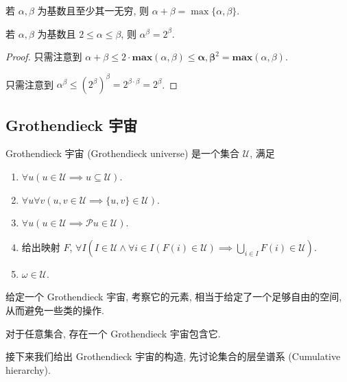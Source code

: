 \begin{corollary}
    若 \(\alpha, \beta\) 为基数且至少其一无穷, 则 \(\alpha + \beta = \max \{\alpha, \beta\}\).

    若 \(\alpha, \beta\) 为基数且 \(2 \le \alpha \le \beta\), 则 \(\alpha^\beta = 2^\beta\).

    \begin{proof}
        只需注意到 \(\alpha + \beta \le 2 \cdot \mathbf{max} (\alpha, \beta) \le \mathbf{\alpha, \beta}^2 = \mathbf{max} (\alpha, \beta)\).

        只需注意到 \(\alpha^\beta \le {(2^\beta)}^\beta = 2^{\beta \cdot \beta} = 2^\beta\).
    \end{proof}
\end{corollary}

\subsection{Grothendieck 宇宙}

\begin{definition}
    Grothendieck 宇宙 (Grothendieck universe) 是一个集合 \(\mathcal{U}\), 满足
    \begin{enumerate}
        \item \(\forall u (u \in \mathcal{U} \implies u \subseteq \mathcal{U})\).
        \item \(\forall u \forall v (u, v \in \mathcal{U} \implies \{u,v\} \in \mathcal{U})\).
        \item \(\forall u (u \in \mathcal{U} \implies \mathcal{P} u \in \mathcal{U})\).
        \item 给出映射 \(F\), \(\forall I (I \in \mathcal{U} \land \forall i \in I (F(i) \in \mathcal{U}) \implies \bigcup_{i \in I} F(i) \in \mathcal{U})\).
        \item \(\omega \in \mathcal{U}\).
    \end{enumerate}
\end{definition}

给定一个 Grothendieck 宇宙, 考察它的元素, 相当于给定了一个足够自由的空间, 从而避免一些类的操作.

\begin{hypothesis}
    [Grothendieck] \label{hypothesis:Grothendieck universe}
    对于任意集合, 存在一个 Grothendieck 宇宙包含它.
\end{hypothesis}

接下来我们给出 Grothendieck 宇宙的构造, 先讨论集合的层垒谱系 (Cumulative hierarchy).

